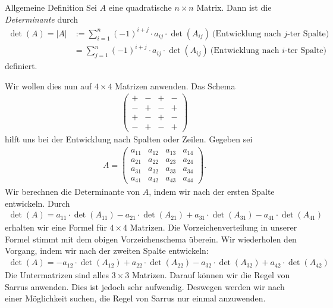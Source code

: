 \begin{mybox}{Allgemeine Definition}
Sei $A$ eine quadratische $n \times n$ Matrix.
Dann ist die \textit{Determinante} durch
\begin{align*}
\det(A) = |A| 
&:= 
\sum \limits_{i=1}^n (-1)^{i+j} \cdot a_{ij} \cdot \det(A_{ij}) \ \text{(Entwicklung nach $j$-ter Spalte)}\\
&=
\sum \limits_{j=1}^n (-1)^{i+j} \cdot a_{ij} \cdot \det(A_{ij}) \ \text{(Entwicklung nach $i$-ter Spalte)}
\end{align*}
definiert. 
\end{mybox}
Wir wollen dies nun auf $4 \times 4$ Matrizen anwenden.
Das Schema 
\begin{align*}
\begin{pmatrix}
+ & - & + & -\\
- & + & - & +\\
+ & - & + & -\\
- & + & - & +
\end{pmatrix}
\end{align*}
hilft uns bei der Entwicklung nach Spalten oder Zeilen.
Gegeben sei
\begin{align*}
A = \begin{pmatrix}
a_{11} & a_{12} & a_{13} & a_{14}\\
a_{21} & a_{22} & a_{23} & a_{24}\\
a_{31} & a_{32} & a_{33} & a_{34}\\
a_{41} & a_{42} & a_{43} & a_{44}
\end{pmatrix}.
\end{align*}
Wir berechnen die Determinante von $A$, indem wir nach der ersten Spalte entwickeln.
Durch 
\begin{align*}
\det(A) = a_{11} \cdot \det (A_{11}) - a_{21} \cdot \det(A_{21}) + a_{31} \cdot \det(A_{31}) - a_{41} \cdot \det(A_{41})
\end{align*}
erhalten wir eine Formel für $4 \times 4$ Matrizen. Die Vorzeichenverteilung in unserer Formel stimmt mit dem obigen Vorzeichenschema überein.
Wir wiederholen den Vorgang, indem wir nach der zweiten Spalte entwickeln:
\begin{align*}
\det(A) =
-a_{12} \cdot \det(A_{12}) + a_{22} \cdot \det(A_{22}) - a_{32} \cdot \det(A_{32}) + a_{42} \cdot \det(A_{42})
\end{align*}
Die Untermatrizen sind alles $3 \times 3$ Matrizen.
Darauf können wir die Regel von Sarrus anwenden. Dies ist jedoch sehr aufwendig.
Deswegen werden wir nach einer Möglichkeit suchen, die Regel von Sarrus nur einmal anzuwenden.\\

